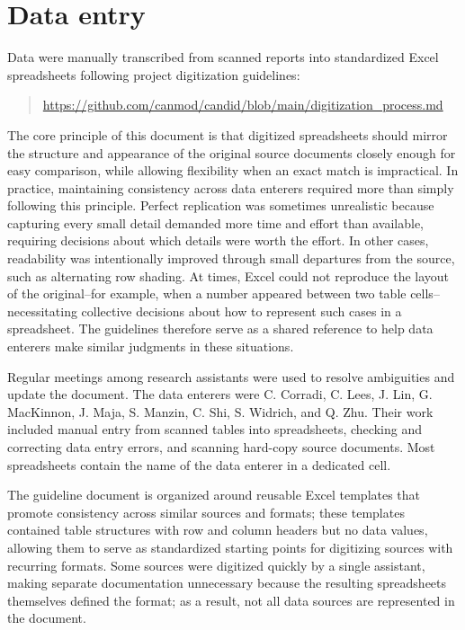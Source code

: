 \documentclass[12pt]{article}
\begin{document}
\clearpage

\section{Data entry}\label{sec:appendix-data-entry}

Data were manually transcribed from scanned reports into standardized Excel spreadsheets following project digitization guidelines:

\begin{quote}
\url{https://github.com/canmod/candid/blob/main/digitization_process.md}
\end{quote}

\noindent The core principle of this document is that digitized spreadsheets should mirror the structure and appearance of the original source documents closely enough for easy comparison, while allowing flexibility when an exact match is impractical. In practice, maintaining consistency across data enterers required more than simply following this principle. Perfect replication was sometimes unrealistic because capturing every small detail demanded more time and effort than available, requiring decisions about which details were worth the effort. In other cases, readability was intentionally improved through small departures from the source, such as alternating row shading. At times, Excel could not reproduce the layout of the original--for example, when a number appeared between two table cells--necessitating collective decisions about how to represent such cases in a spreadsheet. The guidelines therefore serve as a shared reference to help data enterers make similar judgments in these situations.

Regular meetings among research assistants were used to resolve ambiguities and update the document. The data enterers were C. Corradi, C. Lees, J. Lin, G. MacKinnon, J. Maja, S. Manzin, C. Shi, S. Widrich, and Q. Zhu. Their work included manual entry from scanned tables into spreadsheets, checking and correcting data entry errors, and scanning hard-copy source documents. Most spreadsheets contain the name of the data enterer in a dedicated cell.

The guideline document is organized around reusable Excel templates that promote consistency across similar sources and formats; these templates contained table structures with row and column headers but no data values, allowing them to serve as standardized starting points for digitizing sources with recurring formats. Some sources were digitized quickly by a single assistant, making separate documentation unnecessary because the resulting spreadsheets themselves defined the format; as a result, not all data sources are represented in the document.
\end{document}
